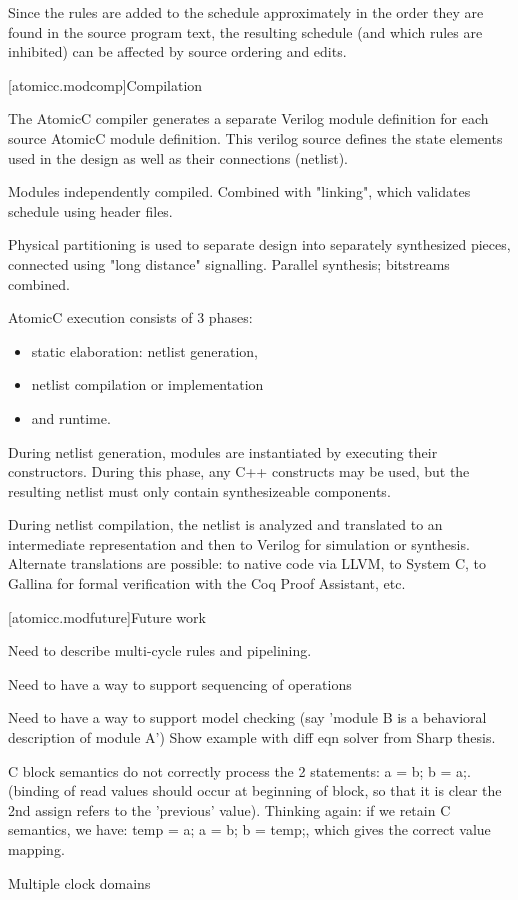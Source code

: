 Since the rules are added to the schedule approximately in the order they are
found in the source program text, the resulting schedule (and which rules are
inhibited) can be affected by source ordering and edits.

[atomicc.modcomp]{Compilation}

The AtomicC compiler generates a separate Verilog module definition
for each source AtomicC module definition.
This verilog source defines the state elements
used in the design as well as their connections (netlist).

Modules independently compiled.  Combined with "linking", which validates schedule using header files.

Physical partitioning is used to separate design into separately synthesized pieces, connected using
"long distance" signalling.  Parallel synthesis; bitstreams combined.

AtomicC execution consists of 3 phases:
\begin{itemize}
\item static elaboration: netlist generation, 
\item netlist compilation or implementation
\item and runtime.
\end{itemize}

During netlist
generation, modules are instantiated by executing their
constructors. During this phase, any C++ constructs may be used, but
the resulting netlist must only contain synthesizeable components.

During netlist compilation, the netlist is analyzed and translated to
an intermediate representation and then to Verilog for simulation or
synthesis. Alternate translations are possible: to native code via
LLVM, to System C, to Gallina for formal verification with the Coq
Proof Assistant, etc.

[atomicc.modfuture]{Future work}

Need to describe multi-cycle rules and pipelining.

Need to have a way to support sequencing of operations

Need to have a way to support model checking (say 'module B is a behavioral description of module A')
Show example with diff eqn solver from Sharp thesis.

C block semantics do not correctly process the 2 statements: a = b; b = a;.
(binding of read values should occur at beginning of block, so that it is clear the
2nd assign refers to the 'previous' value).
Thinking again: if we retain C semantics, we have: temp = a; a = b; b = temp;, which
gives the correct value mapping.

Multiple clock domains
